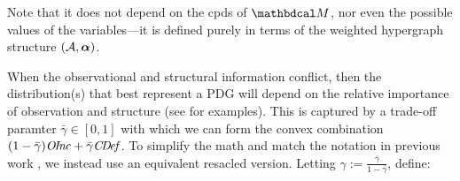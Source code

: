 \documentclass{article}
\newcommand\discard[1]{}
\newcommand\zogamma{{\bar\gamma}}
\begin{document}
Note that
it
does not depend on the cpds
of $\dg M$, nor even the possible values of the variables---it is defined purely in terms of
the weighted hypergraph structure $(\mathcal A,\boldsymbol\alpha)$.


When the observational and structural information conflict, then the distribution(s)
that best represent a PDG will depend on the relative importance of observation and structure (see  for examples).
\discard{
This is captured by a trade-off 
parameter $\gamma \ge 0$, which 
can be used to define the scoring function
$\bbr{\dg M}_\gamma: \Delta \V\!\X \to \Rext$, as follows:
}%
This is captured by a trade-off paramter $\zogamma \in [0,1]$
with which we can form the convex combination
$(1-\zogamma)\OInc + \zogamma \CDef$. 
To simplify the math and match the notation in
previous work \parencite{pdg-aaai,one-true-loss},
we instead use an equivalent resacled version. 
Letting $\gamma := \frac{\zogamma}{1-\zogamma}$, define:
\end{document}
